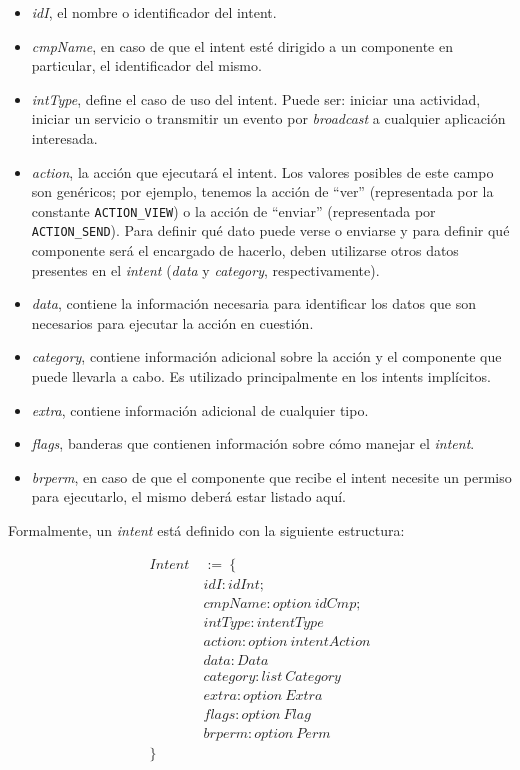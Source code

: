 \begin{itemize}
    \item \textit{idI}, el nombre o identificador del intent.
    \item \textit{cmpName}, en caso de que el intent esté dirigido a un componente en particular, el
          identificador del mismo.
    \item \textit{intType}, define el caso de uso del intent. Puede ser: iniciar una actividad,
          iniciar un servicio o transmitir un evento por \textit{broadcast} a cualquier aplicación
          interesada.
    \item \textit{action}, la acción que ejecutará el intent. Los valores posibles de este campo son
          genéricos; por ejemplo, tenemos la acción de ``ver'' (representada por la constante
          \texttt{ACTION\_VIEW}) o la acción de ``enviar'' (representada por \texttt{ACTION\_SEND}).
          Para definir qué dato puede verse o enviarse y para definir qué componente será el
          encargado de hacerlo, deben utilizarse otros datos presentes en el \textit{intent}
          (\textit{data} y \textit{category}, respectivamente).
    \item \textit{data}, contiene la información necesaria para identificar los datos que son
          necesarios para ejecutar la acción en cuestión.
    \item \textit{category}, contiene información adicional sobre la acción y el componente que
          puede llevarla a cabo. Es utilizado principalmente en los intents implícitos.
    \item \textit{extra}, contiene información adicional de cualquier tipo.
    \item \textit{flags}, banderas que contienen información sobre cómo manejar el \textit{intent}.
    \item\textit{brperm}, en caso de que el componente que recibe el intent necesite un permiso para
          ejecutarlo, el mismo deberá estar listado aquí.
\end{itemize}


Formalmente, un \textit{intent} está definido con la siguiente estructura:

\begin{align*}
    Intent\  & :=\ \{                       \\
             & idI: idInt;                  \\
             & cmpName: option\ idCmp;      \\
             & intType: intentType          \\
             & action: option\ intentAction \\
             & data: Data                   \\
             & category: list\ Category     \\
             & extra: option\ Extra         \\
             & flags: option\ Flag          \\
             & brperm: option\ Perm         \\
    \}
\end{align*}

